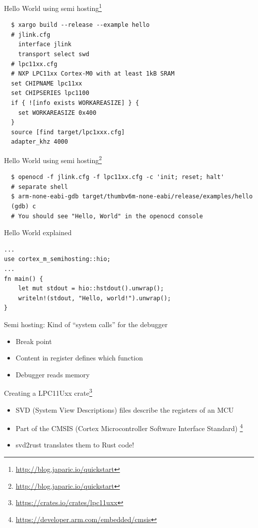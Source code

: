 \documentclass[aspectratio=1610,14pt,t]{beamer}
\begin{document}
\begin{frame}[c,fragile]{Hello World using semi hosting\footnote{\url{http://blog.japaric.io/quickstart}}}
  \begin{verbatim}
  $ xargo build --release --example hello
  # jlink.cfg
    interface jlink
    transport select swd
  # lpc11xx.cfg
  # NXP LPC11xx Cortex-M0 with at least 1kB SRAM
  set CHIPNAME lpc11xx
  set CHIPSERIES lpc1100
  if { ![info exists WORKAREASIZE] } {
    set WORKAREASIZE 0x400
  }
  source [find target/lpc1xxx.cfg]
  adapter_khz 4000
  \end{verbatim}
\end{frame}

\begin{frame}[c,fragile]{Hello World using semi hosting\footnote{\url{http://blog.japaric.io/quickstart}}}
  \begin{verbatim}
  $ openocd -f jlink.cfg -f lpc11xx.cfg -c 'init; reset; halt'
  # separate shell
  $ arm-none-eabi-gdb target/thumbv6m-none-eabi/release/examples/hello
  (gdb) c
  # You should see "Hello, World" in the openocd console
  \end{verbatim}
\end{frame}

\begin{frame}[c,fragile]{Hello World explained}
  \begin{verbatim}
...
use cortex_m_semihosting::hio;
...
fn main() {
    let mut stdout = hio::hstdout().unwrap();
    writeln!(stdout, "Hello, world!").unwrap();
}
  \end{verbatim}
\pause Semi hosting: Kind of ``system calls'' for the debugger
  \begin{itemize}
    \item Break point
    \item Content in register defines which function
    \item Debugger reads memory
  \end{itemize}
\end{frame}

\begin{frame}[c,fragile]{Creating a LPC11Uxx crate\footnote{\url{https://crates.io/crates/lpc11uxx}}}
  \begin{itemize}
    \item SVD (System View Descriptions) files describe the registers of an MCU
    \item Part of the CMSIS (Cortex Microcontroller Software Interface Standard)
      \footnote{\url{https://developer.arm.com/embedded/cmsis}}
    \item svd2rust translates them to Rust code!
  \end{itemize}
\end{frame}
\end{document}
